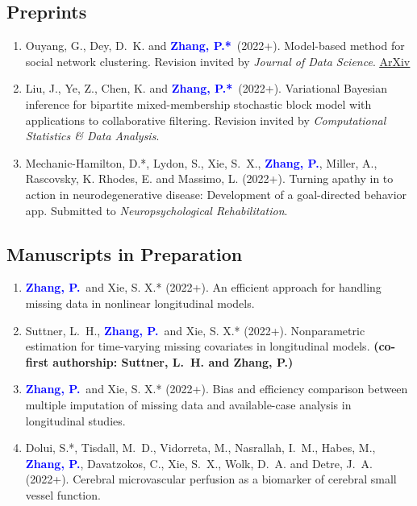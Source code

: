 \documentclass[12pt]{article}
\newcommand{\PZ}{\textbf{\textcolor{blue}{Zhang, P.*}}}
\newcommand{\PZnot}{\textbf{\textcolor{blue}{Zhang, P.}}}
\begin{document}
	\subsection*{Preprints}
	\begin{enumerate}	
		\item {\sc Ouyang, G., Dey, D.\ K.} and \PZ\ (2022+). 
		Model-based method for social network clustering. Revision 
		invited by {\em Journal of Data Science}. 
		\href{https://arxiv.org/pdf/1708.07604.pdf}{\underline{ArXiv}}
		
		\item {\sc Liu, J., Ye, Z., Chen, K.} and \PZ\ (2022+). Variational Bayesian inference for bipartite mixed-membership stochastic block model with applications to collaborative filtering. Revision invited by {\em Computational Statistics \& Data Analysis}.
		
		\item {\sc Mechanic-Hamilton, D.*, Lydon, S., Xie, S.\ X.,} 
		\PZnot, {\sc Miller, A., Rascovsky, K. Rhodes, E.} and {\sc 
		Massimo, L.} (2022+). Turning apathy in to action in 
		neurodegenerative disease: Development of a goal-directed 
		behavior app. Submitted to {\em Neuropsychological 
		Rehabilitation}.
	\end{enumerate}
	
	\subsection*{Manuscripts in Preparation}
	\begin{enumerate}
		\item \PZnot\ and {\sc Xie, S. X.*} (2022+). An efficient 
		approach for handling missing data in nonlinear longitudinal
		models.	
		
		\item {\sc Suttner, L.\ H.,} \PZnot\ and {\sc Xie, S. X.*} 
		(2022+). Nonparametric estimation for time-varying missing 
		covariates in longitudinal models.  {\bf (co-first 
		authorship: Suttner, L.\ H. and Zhang, P.)}
		
		\item \PZnot\ and {\sc Xie, S. X.*} (2022+). Bias 
		and efficiency comparison between multiple imputation of missing data and available-case analysis in longitudinal studies.
		
		\item {\sc Dolui, S.*, Tisdall, M.\ D., Vidorreta, M., Nasrallah, I.\ M., Habes, M.}, \PZnot, {\sc Davatzokos, C., Xie, S.\ X., Wolk, D.\ A.} and {\sc Detre, J.\ A.} 
		(2022+). Cerebral microvascular perfusion as a biomarker of 
		cerebral small vessel function.
	\end{enumerate}
	
\end{document}
